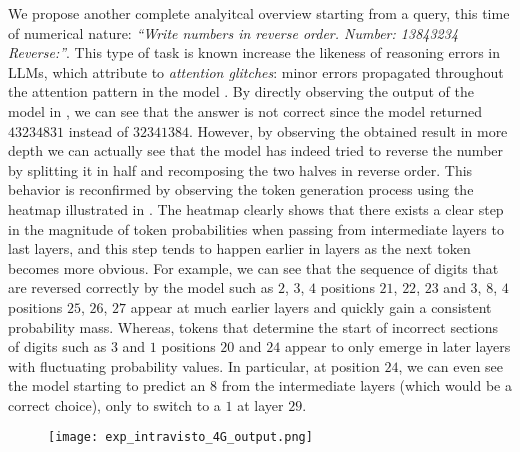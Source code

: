 We propose another complete analyitcal overview starting from a query, this time of numerical nature: \emph{``Write numbers in reverse order. Number: 13843234 Reverse:''}.
This type of task is known increase the likeness of reasoning errors in LLMs, which  attribute to \emph{attention glitches}: minor errors propagated throughout the attention pattern in the model .
By directly observing the output of the model in , we can see that the answer is not correct since the model returned $43234831$ instead of $32341384$.
However, by observing the obtained result in more depth we can actually see that the model has indeed tried to reverse the number by splitting it in half and recomposing the two halves in reverse order.
This behavior is reconfirmed by observing the token generation process using the heatmap illustrated in .
The heatmap clearly shows that there exists a clear step in the magnitude of token probabilities when passing from intermediate layers to last layers, and this step  tends to happen earlier in layers as the next token becomes more obvious.
For example, we can see that the sequence of digits that are reversed correctly by the model such as $2$, $3$, $4$  positions $21$, $22$, $23$ and $3$, $8$, $4$  positions $25$, $26$, $27$ appear at much earlier layers and quickly gain a consistent probability mass.
Whereas, tokens that determine the start of incorrect sections of digits such as $3$ and $1$  positions $20$ and $24$ appear to only emerge in later layers with fluctuating probability values.
In particular,  at position $24$, we can even see the model starting to predict an $8$ from the intermediate layers (which would be a correct choice), only to switch to a $1$ at layer $29$.

\begin{figure}[t!]
    \centering
    \quad
    \label{fig:exp_intravisto_4_G}
\end{figure}

\begin{figure}[t!]
    \centering
    \texttt{[image: exp\_intravisto\_4G\_output.png]}
    \label{fig:exp_intravisto_4_G1}
\end{figure}

